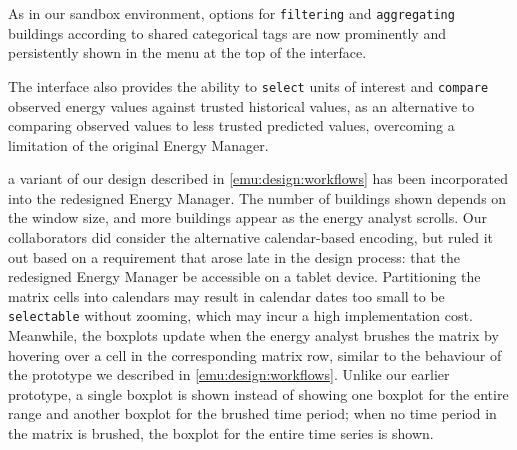 
As in our sandbox environment, options for {\tt filtering} and {\tt aggregating} buildings according to shared categorical tags are now prominently and persistently shown in the menu at the top of the interface. 

The interface also provides the ability to {\tt select} units of interest and {\tt compare} observed energy values against trusted historical values, as an alternative to comparing observed values to less trusted predicted values, overcoming a limitation of the original Energy Manager.

 a variant of our design described in \autoref{emu:design:workflows} has been incorporated into the redesigned Energy Manager.
The number of buildings shown depends on the window size, and more buildings appear as the energy analyst scrolls.
Our collaborators did consider the alternative calendar-based encoding, but ruled it out based on a requirement that arose late in the design process: that the redesigned Energy Manager be accessible on a tablet device. 
Partitioning the matrix cells into calendars may result in calendar dates too small to be {\tt selectable} without zooming, which may incur a high implementation cost.
Meanwhile, the boxplots update when the energy analyst brushes the matrix by hovering over a cell in the corresponding matrix row, similar to the behaviour of the prototype we described in \autoref{emu:design:workflows}. 
Unlike our earlier prototype, a single boxplot is shown instead of showing one boxplot for the entire range and another boxplot for the brushed time period; when no time period in the matrix is brushed, the boxplot for the entire time series is shown.

